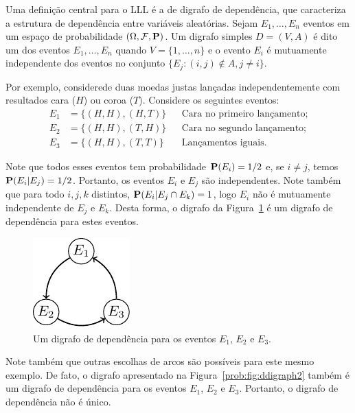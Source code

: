 Uma definição central para o LLL é a de digrafo de dependência, que caracteriza a estrutura de dependência entre variáveis aleatórias. Sejam $E_1, \dots, E_n$ eventos em um espaço de probabilidade $(\Omega, \mathcal{F}, \operatorname{\mathbf{P}})$. Um digrafo simples $D = (V,A)$ é dito um  dos eventos $E_1, \dots, E_n$ quando $V = \{1, \dots, n\}$ e o evento $E_i$ é mutuamente independente dos eventos no conjunto $\{ E_j : (i,j) \not\in A, j \neq i\}$.

Por exemplo, considerede duas moedas justas lançadas independentemente com resultados cara ($H$) ou coroa ($T$). Considere os seguintes eventos:
\begin{align*}
  E_1 &= \{ (H,H) , (H,T) \} && \text{Cara no primeiro lançamento;}\\
  E_2 &= \{ (H,H) , (T,H) \} && \text{Cara no segundo lançamento;}\\
  E_3 &= \{ (H,H) , (T,T) \} && \text{Lançamentos iguais.}
\end{align*}

Note que todos esses eventos tem probabilidade $\operatorname{\mathbf{P}}(E_i) = 1/2$ e, se $i \neq j$, temos $\operatorname{\mathbf{P}}(E_i | E_j) = 1/2$. Portanto, os eventos $E_i$ e $E_j$ são independentes. Note também que para todo $i,j,k$ distintos, $\operatorname{\mathbf{P}}(E_i | E_j \cap E_k) = 1$, logo $E_i$ não é mutuamente independente de $E_j$ e $E_k$. Desta forma, o digrafo da Figura~\ref{prob:fig:ddigraph} é um digrafo de dependência para estes eventos.

\begin{figure}[ht!]
\centering
\includegraphics{figures/4_prob_1_ddigraph}
\caption{Um digrafo de dependência para os eventos $E_1$, $E_2$ e $E_3$.}
\label{prob:fig:ddigraph}
\end{figure}

Note também que outras escolhas de arcos são possíveis para este mesmo exemplo. De fato, o digrafo apresentado na Figura~\ref{prob:fig:ddigraph2} também é um digrafo de dependência para os eventos $E_1$, $E_2$ e $E_3$. Portanto, o digrafo de dependência não é único.

